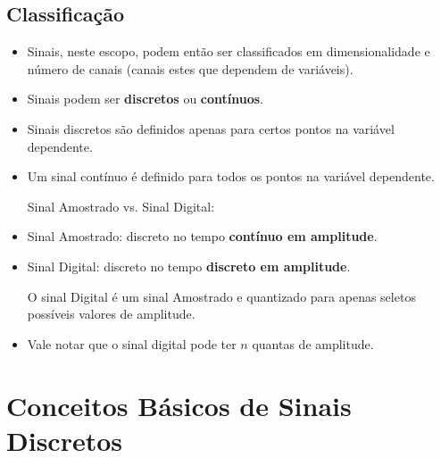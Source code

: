 \subsection{Classificação}
\begin{itemize}
    \item Sinais, neste escopo, podem então ser classificados em dimensionalidade e número de canais (canais estes que dependem de variáveis).
    \item Sinais podem ser \textbf{discretos} ou \textbf{contínuos}.
    \item Sinais discretos são definidos apenas para certos pontos na variável dependente.
    \item Um sinal contínuo é definido para todos os pontos na variável dependente.
    
    Sinal Amostrado vs. Sinal Digital:

    \item Sinal Amostrado: discreto no tempo \textbf{contínuo em amplitude}.
    \item Sinal Digital: discreto no tempo \textbf{discreto em amplitude}.
    
    O sinal Digital é um sinal Amostrado e quantizado para apenas seletos possíveis valores de amplitude.

    \item Vale notar que o sinal digital pode ter $n$ quantas de amplitude.
\end{itemize}

\section{Conceitos Básicos de Sinais Discretos}
